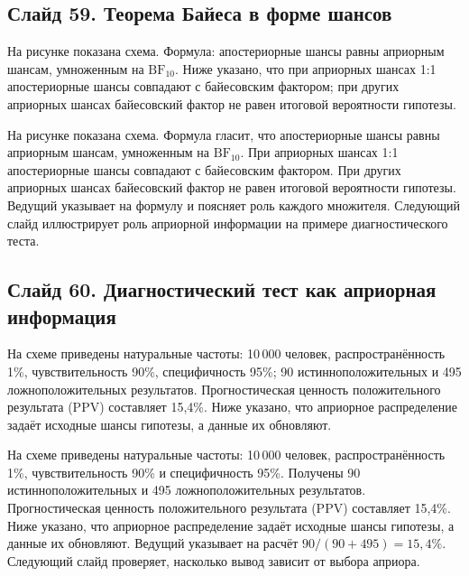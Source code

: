 \documentclass[11pt,a4paper]{article}
\begin{document}
\subsection*{Слайд 59. Теорема Байеса в форме шансов}
\begin{onslide}
На рисунке показана схема. Формула: апостериорные шансы равны априорным шансам, умноженным на $\mathrm{BF}_{10}$. Ниже указано, что при априорных шансах 1:1 апостериорные шансы совпадают с байесовским фактором; при других априорных шансах байесовский фактор не равен итоговой вероятности гипотезы.
\end{onslide}
На рисунке показана схема. Формула гласит, что апостериорные шансы равны априорным шансам, умноженным на $\mathrm{BF}_{10}$. При априорных шансах 1:1 апостериорные шансы совпадают с байесовским фактором. При других априорных шансах байесовский фактор не равен итоговой вероятности гипотезы. Ведущий указывает на формулу и поясняет роль каждого множителя. Следующий слайд иллюстрирует роль априорной информации на примере диагностического теста.

\subsection*{Слайд 60. Диагностический тест как априорная информация}
\begin{onslide}
На схеме приведены натуральные частоты: 10\,000 человек, распространённость 1\%, чувствительность 90\%, специфичность 95\%; 90 истинноположительных и 495 ложноположительных результатов. Прогностическая ценность положительного результата (PPV) составляет 15,4\%. Ниже указано, что априорное распределение задаёт исходные шансы гипотезы, а данные их обновляют.
\end{onslide}
На схеме приведены натуральные частоты: 10\,000 человек, распространённость 1\%, чувствительность 90\% и специфичность 95\%. Получены 90 истинноположительных и 495 ложноположительных результатов. Прогностическая ценность положительного результата (PPV) составляет 15,4\%. Ниже указано, что априорное распределение задаёт исходные шансы гипотезы, а данные их обновляют. Ведущий указывает на расчёт $90/(90+495) = 15{,}4\%$. Следующий слайд проверяет, насколько вывод зависит от выбора априора.
\end{document}
